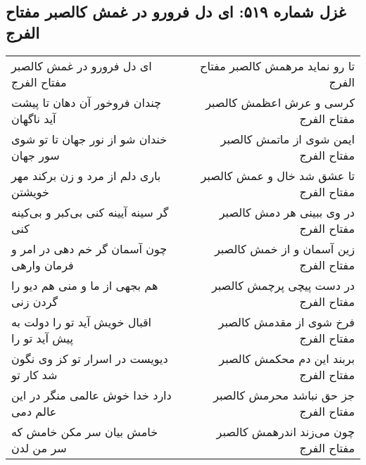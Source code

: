\begin{center}
\section*{غزل شماره ۵۱۹: ای دل فرورو در غمش کالصبر مفتاح الفرج}
\label{sec:0519}
\begin{longtable}{l p{0.5cm} r}
ای دل فرورو در غمش کالصبر مفتاح الفرج
&&
تا رو نماید مرهمش کالصبر مفتاح الفرج
\\
چندان فروخور آن دهان تا پیشت آید ناگهان
&&
کرسی و عرش اعظمش کالصبر مفتاح الفرج
\\
خندان شو از نور جهان تا تو شوی سور جهان
&&
ایمن شوی از ماتمش کالصبر مفتاح الفرج
\\
باری دلم از مرد و زن برکند مهر خویشتن
&&
تا عشق شد خال و عمش کالصبر مفتاح الفرج
\\
گر سینه آیینه کنی بی‌کبر و بی‌کینه کنی
&&
در وی ببینی هر دمش کالصبر مفتاح الفرج
\\
چون آسمان گر خم دهی در امر و فرمان وارهی
&&
زین آسمان و از خمش کالصبر مفتاح الفرج
\\
هم بجهی از ما و منی هم دیو را گردن زنی
&&
در دست پیچی پرچمش کالصبر مفتاح الفرج
\\
اقبال خویش آید تو را دولت به پیش آید تو را
&&
فرخ شوی از مقدمش کالصبر مفتاح الفرج
\\
دیویست در اسرار تو کز وی نگون شد کار تو
&&
بربند این دم محکمش کالصبر مفتاح الفرج
\\
دارد خدا خوش عالمی منگر در این عالم دمی
&&
جز حق نباشد محرمش کالصبر مفتاح الفرج
\\
خامش بیان سر مکن خامش که سر من لدن
&&
چون می‌زند اندرهمش کالصبر مفتاح الفرج
\\
\end{longtable}
\end{center}
